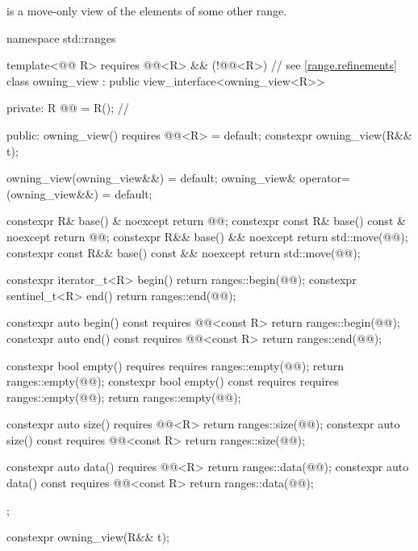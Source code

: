 \pnum
{} is a move-only view
of the elements of some other range.
\begin{codeblock}
namespace std::ranges {
  template<@@ R>
    requires @@<R> && (!@@<R>) // see \ref{range.refinements}
  class owning_view : public view_interface<owning_view<R>> {
  private:
    R @@ = R();         // \expos

  public:
    owning_view() requires @@<R> = default;
    constexpr owning_view(R&& t);

    owning_view(owning_view&&) = default;
    owning_view& operator=(owning_view&&) = default;

    constexpr R& base() & noexcept { return @@; }
    constexpr const R& base() const & noexcept { return @@; }
    constexpr R&& base() && noexcept { return std::move(@@); }
    constexpr const R&& base() const && noexcept { return std::move(@@); }

    constexpr iterator_t<R> begin() { return ranges::begin(@@); }
    constexpr sentinel_t<R> end() { return ranges::end(@@); }

    constexpr auto begin() const requires @@<const R>
    { return ranges::begin(@@); }
    constexpr auto end() const requires @@<const R>
    { return ranges::end(@@); }

    constexpr bool empty() requires requires { ranges::empty(@@); }
    { return ranges::empty(@@); }
    constexpr bool empty() const requires requires { ranges::empty(@@); }
    { return ranges::empty(@@); }

    constexpr auto size() requires @@<R>
    { return ranges::size(@@); }
    constexpr auto size() const requires @@<const R>
    { return ranges::size(@@); }

    constexpr auto data() requires @@<R>
    { return ranges::data(@@); }
    constexpr auto data() const requires @@<const R>
    { return ranges::data(@@); }
  };
}
\end{codeblock}

\begin{itemdecl}
constexpr owning_view(R&& t);
\end{itemdecl}

